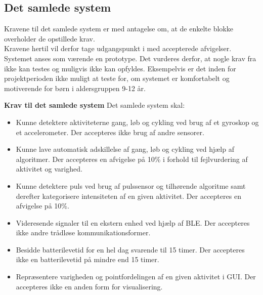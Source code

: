 \subsection{Det samlede system} \label{krav_samlet_sys}
Kravene til det samlede system er med antagelse om, at de enkelte blokke overholder de opstillede krav.\\
Kravene hertil vil derfor tage udgangspunkt i  med accepterede afvigelser. Systemet anses som værende en prototype. Det vurderes derfor, at nogle krav fra  ikke kan testes og muligvis ikke kan opfyldes. Eksempelvis er det inden for projektperioden ikke muligt at teste for, om systemet er komfortabelt og motiverende for børn i aldersgruppen 9-12 år.

\textbf{Krav til det samlede system} \newline
Det samlede system skal:
\begin{itemize}
	\item Kunne detektere aktiviteterne gang, løb og cykling ved brug af et gyroskop og et accelerometer. Der accepteres ikke brug af andre sensorer.
	\item Kunne lave automatisk adskillelse af gang, løb og cykling ved hjælp af algoritmer. Der accepteres en afvigelse på 10\% i forhold til fejlvurdering af aktivitet og varighed.
	\item Kunne detektere puls ved brug af pulssensor og tilhørende algoritme samt derefter kategorisere intensiteten af en given aktivitet. Der accepteres en afvigelse på 10\%.
	\item Videresende signaler til en ekstern enhed ved hjælp af BLE. Der accepteres ikke andre trådløse kommunikationsformer.
	\item Besidde batterilevetid for en hel dag svarende til 15 timer. Der accepteres ikke en batterilevetid på mindre end 15 timer.
	\item Repræsentere varigheden og pointfordelingen af en given aktivitet i GUI. Der accepteres ikke en anden form for visualisering.	
\end{itemize}

